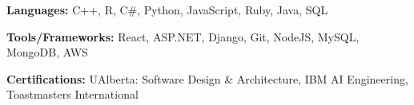 
\begin{siderulesSos}
\begin{skillSection}
\cvskillentry
    {
      \begin{cvsositems}
        \item {\color{black}\textbf{Languages:} C++, R, C\#, Python, JavaScript, Ruby, Java, SQL}
        \item {\color{black}\textbf{Tools/Frameworks:} React, ASP.NET, Django, Git, NodeJS, MySQL, MongoDB, AWS}
        \item {\color{black}\textbf{Certifications:} UAlberta: Software Design \& Architecture, IBM AI Engineering, Toastmasters International}
      \end{cvsositems}
    }
\end{skillSection}
\end{siderulesSos}